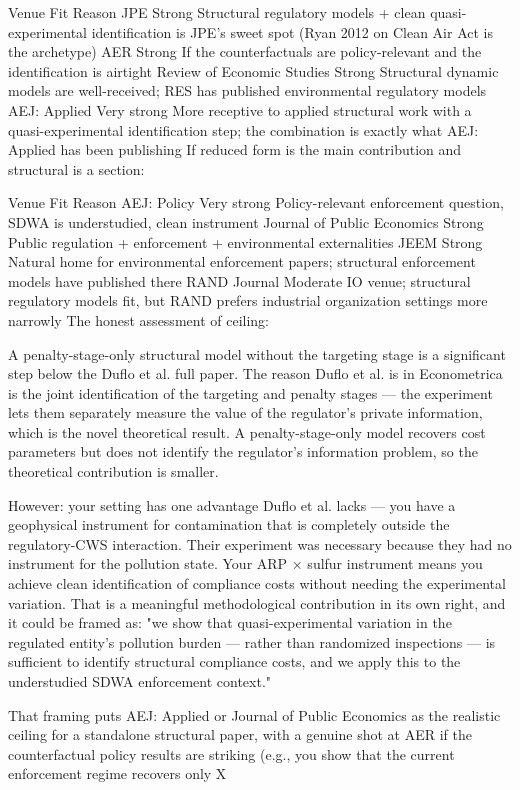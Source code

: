 Venue	Fit	Reason
JPE	Strong	Structural regulatory models + clean quasi-experimental identification is JPE's sweet spot (Ryan 2012 on Clean Air Act is the archetype)
AER	Strong	If the counterfactuals are policy-relevant and the identification is airtight
Review of Economic Studies	Strong	Structural dynamic models are well-received; RES has published environmental regulatory models
AEJ: Applied	Very strong	More receptive to applied structural work with a quasi-experimental identification step; the combination is exactly what AEJ: Applied has been publishing
If reduced form is the main contribution and structural is a section:

Venue	Fit	Reason
AEJ: Policy	Very strong	Policy-relevant enforcement question, SDWA is understudied, clean instrument
Journal of Public Economics	Strong	Public regulation + enforcement + environmental externalities
JEEM	Strong	Natural home for environmental enforcement papers; structural enforcement models have published there
RAND Journal	Moderate	IO venue; structural regulatory models fit, but RAND prefers industrial organization settings more narrowly
The honest assessment of ceiling:

A penalty-stage-only structural model without the targeting stage is a significant step below the Duflo et al. full paper. The reason Duflo et al. is in Econometrica is the joint identification of the targeting and penalty stages — the experiment lets them separately measure the value of the regulator's private information, which is the novel theoretical result. A penalty-stage-only model recovers cost parameters but does not identify the regulator's information problem, so the theoretical contribution is smaller.

However: your setting has one advantage Duflo et al. lacks — you have a geophysical instrument for contamination that is completely outside the regulatory-CWS interaction. Their experiment was necessary because they had no instrument for the pollution state. Your ARP × sulfur instrument means you achieve clean identification of compliance costs without needing the experimental variation. That is a meaningful methodological contribution in its own right, and it could be framed as: "we show that quasi-experimental variation in the regulated entity's pollution burden — rather than randomized inspections — is sufficient to identify structural compliance costs, and we apply this to the understudied SDWA enforcement context."

That framing puts AEJ: Applied or Journal of Public Economics as the realistic ceiling for a standalone structural paper, with a genuine shot at AER if the counterfactual policy results are striking (e.g., you show that the current enforcement regime recovers only X%

